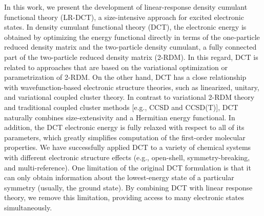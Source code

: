In this work, we present the development of linear-response density cumulant
functional theory (LR-DCT), a size-intensive approach for excited
electronic states. In density cumulant functional theory (DCT),
\cite{Kutzelnigg:2006p171101,Simmonett:2010p174122,Sokolov:2012p054105,Sokolov:2013p024107,Sokolov:2013p204110,Sokolov:2014p074111,Wang:2016p4833}
the
electronic energy is obtained by optimizing the energy functional directly in
terms of the one-particle reduced density matrix and the two-particle density
cumulant, a fully connected part of the two-particle reduced density matrix
(2-RDM).
\cite{Fulde:1991,Ziesche:1992p597,Kutzelnigg:1997p432,Mazziotti:1998p419,Mazziotti:1998p4219,Kutzelnigg:1999p2800,Ziesche:2000p33,Herbert:2007p261,Kong:2011p214109,Hanauer:2012p50}
In this regard, DCT is related to approaches that are based on
the variational optimization
\cite{Colmenero:1993p979,Nakatsuji:1996p1039,Mazziotti:1998p4219,Mazziotti:2006p143002,Kollmar:2006p084108,DePrince:2007p042501,DePrince:2016p164109}
or parametrization
\cite{Mazziotti:2008p253002,Mazziotti:2010p062515,DePrince:2012p1917}
of 2-RDM\@. On
the other hand, DCT has a close relationship
\cite{Sokolov:2013p024107,Sokolov:2013p204110}
with wavefunction-based electronic
structure theories, such as linearized, unitary, and variational coupled
cluster theory.
\cite{Kutzelnigg:1991p349,Kutzelnigg:1998p65,VanVoorhis:2000p8873,Kutzelnigg:1982p3081,Bartlett:1989p133,Watts:1989p359,Szalay:1995p281,Cooper:2010p234102,Evangelista:2011p224102}
In contrast to variational 2-RDM theory
\cite{Nakata:2009p042109,vanAggelen:2010p114112,Verstichel:2010p114113}
and traditional
coupled cluster methods [e.g., CCSD and CCSD(T)],
\cite{Crawford:2000p33,Shavitt:2009}
DCT naturally combines
size-extensivity and a Hermitian energy functional. In addition, the DCT
electronic energy is fully relaxed with respect to all of its parameters, which
greatly simplifies computation of the first-order molecular properties.
\cite{Scheiner:1987p5361,Salter:1989p1752,Gauss:1991p2623,Gauss:1991p207}
We have successfully applied DCT to a variety of chemical systems with
different electronic structure effects (e.g., open-shell, symmetry-breaking,
and multi-reference).
\cite{Sokolov:2013p204110,Sokolov:2014p074111,Wang:2016p4833,Copan:2014p2389,Mullinax:2015p2487}
One limitation of the original DCT formulation is
that it can only obtain information about the lowest-energy state of a
particular symmetry (usually, the ground state). By combining DCT with linear
response theory, we remove this limitation, providing access to many electronic
states simultaneously.

